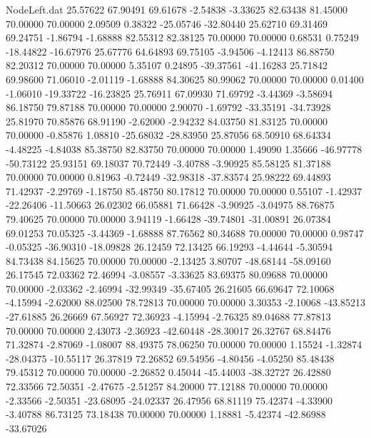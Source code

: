 \begin{filecontents}{NodeLeft.dat}
  25.57622   67.90491   69.61678    -2.54838   -3.33625   82.63438   81.45000   70.00000   70.00000    2.09509    0.38322  -25.05746  -32.80440
  25.62710   69.31469   69.24751    -1.86794   -1.68888   82.55312   82.38125   70.00000   70.00000    0.68531    0.75249  -18.44822  -16.67976
  25.67776   64.64893   69.75105    -3.94506   -4.12413   86.88750   82.20312   70.00000   70.00000    5.35107    0.24895  -39.37561  -41.16283
  25.71842   69.98600   71.06010    -2.01119   -1.68888   84.30625   80.99062   70.00000   70.00000    0.01400   -1.06010  -19.33722  -16.23825
  25.76911   67.09930   71.69792    -3.44369   -3.58694   86.18750   79.87188   70.00000   70.00000    2.90070   -1.69792  -33.35191  -34.73928
  25.81970   70.85876   68.91190    -2.62000   -2.94232   84.03750   81.83125   70.00000   70.00000   -0.85876    1.08810  -25.68032  -28.83950
  25.87056   68.50910   68.64334    -4.48225   -4.84038   85.38750   82.83750   70.00000   70.00000    1.49090    1.35666  -46.97778  -50.73122
  25.93151   69.18037   70.72449    -3.40788   -3.90925   85.58125   81.37188   70.00000   70.00000    0.81963   -0.72449  -32.98318  -37.83574
  25.98222   69.44893   71.42937    -2.29769   -1.18750   85.48750   80.17812   70.00000   70.00000    0.55107   -1.42937  -22.26406  -11.50663
  26.02302   66.05881   71.66428    -3.90925   -3.04975   88.76875   79.40625   70.00000   70.00000    3.94119   -1.66428  -39.74801  -31.00891
  26.07384   69.01253   70.05325    -3.44369   -1.68888   87.76562   80.34688   70.00000   70.00000    0.98747   -0.05325  -36.90310  -18.09828
  26.12459   72.13425   66.19293    -4.44644   -5.30594   84.73438   84.15625   70.00000   70.00000   -2.13425    3.80707  -48.68144  -58.09160
  26.17545   72.03362   72.46994    -3.08557   -3.33625   83.69375   80.09688   70.00000   70.00000   -2.03362   -2.46994  -32.99349  -35.67405
  26.21605   66.69647   72.10068    -4.15994   -2.62000   88.02500   78.72813   70.00000   70.00000    3.30353   -2.10068  -43.85213  -27.61885
  26.26669   67.56927   72.36923    -4.15994   -2.76325   89.04688   77.87813   70.00000   70.00000    2.43073   -2.36923  -42.60448  -28.30017
  26.32767   68.84476   71.32874    -2.87069   -1.08007   88.49375   78.06250   70.00000   70.00000    1.15524   -1.32874  -28.04375  -10.55117
  26.37819   72.26852   69.54956    -4.80456   -4.05250   85.48438   79.45312   70.00000   70.00000   -2.26852    0.45044  -45.44003  -38.32727
  26.42880   72.33566   72.50351    -2.47675   -2.51257   84.20000   77.12188   70.00000   70.00000   -2.33566   -2.50351  -23.68095  -24.02337
  26.47956   68.81119   75.42374    -4.33900   -3.40788   86.73125   73.18438   70.00000   70.00000    1.18881   -5.42374  -42.86988  -33.67026

\end{filecontents}
